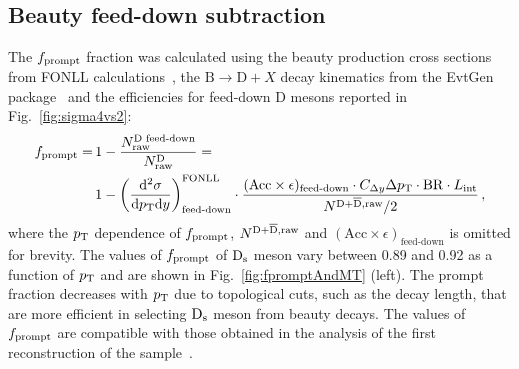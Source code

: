 \subsection{Beauty feed-down subtraction}
\label{sec:ppFprompt}
The $f_{\rm prompt}$ fraction was calculated using the beauty production cross sections from  
FONLL calculations~\cite{Cacciari:1998it, Cacciari:2001td}, the 
$\mathrm{B} \rightarrow \mathrm{D} + X$ decay kinematics from the EvtGen package~\cite{Lange:2001uf} 
and the efficiencies for feed-down D mesons reported in 
Fig.~\ref{fig:sigma4vs2}:
\begin{equation}
\label{eq:fpr}
\begin{split}
f_{\mathrm{prompt}} = \, & 1- \frac{N^{\text{D~feed-down}}_{\mathrm{raw}}}{N^{\mathrm{D}}_{\mathrm{raw}}}=\\
& 1- \left (\frac{\rm d^2 \sigma}{\mathrm dp_{\rm T} \mathrm d y} \right)^{\rm FONLL}_{\text{feed-down}} \cdot \frac{(\mathrm{Acc} \times \epsilon)_\text{feed-down} \cdot C_{\Delta y} \Delta p_{\rm T} \cdot \mathrm{BR} \cdot L_{\rm int}}{N^{\rm D +\overline{D},raw}/2}\,,
\end{split}
\end{equation}
where the $p_{\rm T}$ dependence of $f_{\rm prompt}$, $N^{\rm D +\overline{D},raw}$ and
$(\mathrm{Acc} \times \epsilon)_\text{feed-down}$ is omitted for brevity.
The values of $f_{\rm prompt}$ of ${\rm D_s}$ meson vary between 0.89 and 0.92 as a function
of $p_{\rm T}$ and are shown in Fig.~\ref{fig:fpromptAndMT} (left). 
The prompt fraction decreases with $p_{\rm T}$
due to topological cuts, such as the decay length, that are more efficient
in selecting ${\rm D_s}$ meson from beauty decays. The values of $f_{\rm prompt}$
are compatible with those obtained in the analysis of the first reconstruction of the sample~\cite{Abelev:2012tca}. 
